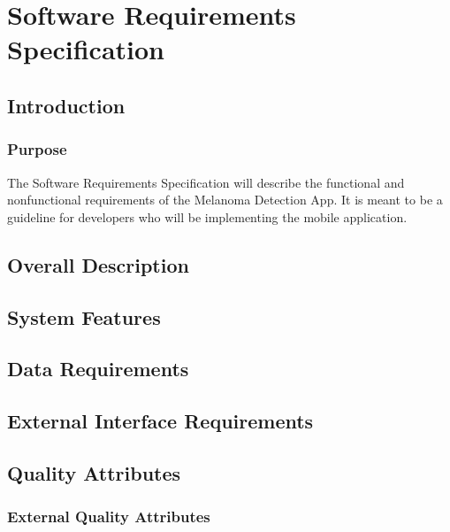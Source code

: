         


\section{Software Requirements Specification}

    \subsection{Introduction}
        \subsubsection{Purpose}

            The Software Requirements Specification will describe the functional and nonfunctional requirements of the Melanoma Detection App. It is meant to be a guideline for developers who will be implementing the mobile application.

    \subsection{Overall Description}
        

    \subsection{System Features}
        

    \subsection{Data Requirements}
    

    \subsection{External Interface Requirements}
        

    \subsection{Quality Attributes} %
        \subsubsection{External Quality Attributes}

